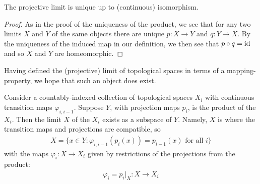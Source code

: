       \begin{claim}
        The projective limit is unique up to (continuous) isomorphism.
        \begin{proof}
          As in the proof of the uniqueness of the product, we see that for any two limits $X$ and $Y$ of the same objects there are unique $p:X\rightarrow Y$ and $q:Y\rightarrow X$.
          By the uniqueness of the induced map in our definition, we then see that $p\circ q=\operatorname{id}$ and so $X$ and $Y$ are homeomorphic.
        \end{proof}
      \end{claim}

      Having defined the (projective) limit of topological spaces in terms of a mapping-property, we hope that such an object does exist.
      \begin{thm}
        \label{claim:limitexists}
        Consider a countably-indexed collection of topological spaces $X_i$ with continuous transition maps $\varphi_{i,i-1}$.
        Suppose $Y$, with projection maps $p_i$, is the product of the $X_i$.
        Then the limit $X$ of the $X_i$ exists as a subspace of $Y$.
        Namely, $X$ is where the transition maps and projections are compatible, so
        \begin{align*}
          X = \{x\in Y: \varphi_{i,i-1}(p_i(x)) = p_{i-1}(x) \text{ for all } i\}
        \end{align*}
        with the maps $\varphi_i:X\rightarrow X_i$ given by restrictions of the projections from the product:
        \begin{align*}
          \varphi_i = p_i|_X :X\rightarrow X_i
        \end{align*}
      \end{thm}
